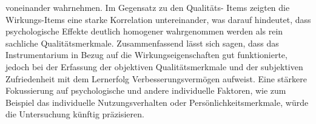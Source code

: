 \documentclass[a4paper, 12pt]{article}
\begin{document}
voneinander wahrnehmen. Im Gegensatz zu den Qualitäts- Items zeigten die Wirkungs-Items eine starke Korrelation untereinander, was darauf hindeutet, dass psychologische Effekte deutlich homogener wahrgenommen werden als rein sachliche Qualitätsmerkmale. Zusammenfassend lässt sich sagen, dass das Instrumentarium in Bezug auf die Wirkungseigenschaften gut funktionierte, jedoch bei der Erfassung der objektiven Qualitätsmerkmale und der subjektiven Zufriedenheit mit dem Lernerfolg Verbesserungsvermögen aufweist. Eine stärkere Fokussierung auf psychologische und andere individuelle Faktoren, wie zum Beispiel das individuelle Nutzungsverhalten oder Persönlichkeitsmerkmale, würde die Untersuchung künftig präzisieren.
\end{document}
